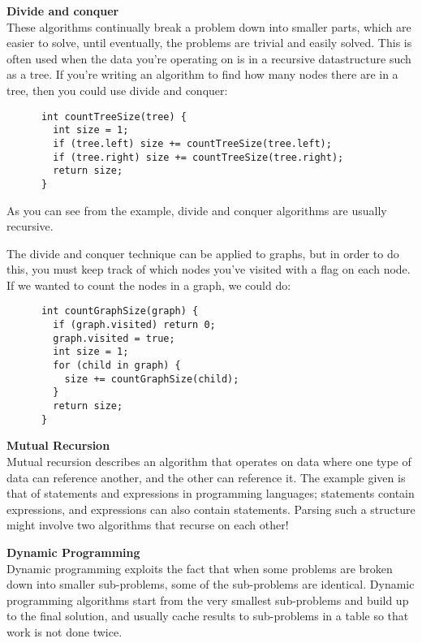\begin{description}
  \item \textbf{Divide and conquer}\\
    These algorithms continually break a problem down into smaller parts, which
    are easier to solve, until eventually, the problems are trivial and easily
    solved. This is often used when the data you're operating on is in a
    recursive datastructure such as a tree. If you're writing an algorithm to
    find how many nodes there are in a tree, then you could use divide and
    conquer:

    \begin{lstlisting}
      int countTreeSize(tree) {
        int size = 1;
        if (tree.left) size += countTreeSize(tree.left);
        if (tree.right) size += countTreeSize(tree.right);
        return size;
      }
    \end{lstlisting}

    As you can see from the example, divide and conquer algorithms are usually
    recursive.

    The divide and conquer technique can be applied to graphs, but in order to
    do this, you must keep track of which nodes you've visited with a flag on
    each node. If we wanted to count the nodes in a graph, we could do:

    \begin{lstlisting}
      int countGraphSize(graph) {
        if (graph.visited) return 0;
        graph.visited = true;
        int size = 1;
        for (child in graph) {
          size += countGraphSize(child);
        }
        return size;
      }
    \end{lstlisting}

  \item \textbf{Mutual Recursion}\\
    Mutual recursion describes an algorithm that operates on data where one type
    of data can reference another, and the other can reference it. The example
    given is that of statements and expressions in programming languages;
    statements contain expressions, and expressions can also contain statements.
    Parsing such a structure might involve two algorithms that recurse on each
    other!

  \item \textbf{Dynamic Programming}\\
    Dynamic programming exploits the fact that when some problems are broken
    down into smaller sub-problems, some of the sub-problems are identical.
    Dynamic programming algorithms start from the very smallest sub-problems and
    build up to the final solution, and usually cache results to sub-problems in
    a table so that work is not done twice.

\end{description}

